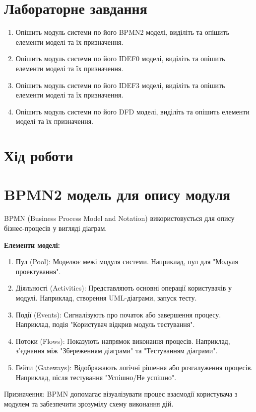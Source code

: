 \documentclass[oneside,14pt]{extarticle}
\begin{document}
\begin{normalsize}
    \section*{Лабораторне завдання}
    \begin{enumerate}
    	\item Опішить модуль системи по його BPMN2 моделі, виділіть та опішить елементи моделі та їх призначення.
    	\item Опішить модуль системи по його IDEF0 моделі, виділіть та опішить елементи моделі та їх призначення.
    	\item Опішить модуль системи по його IDEF3 моделі, виділіть та опішить елементи моделі та їх призначення.
    	\item Опішить модуль системи по його DFD моделі, виділіть та опішить елементи моделі та їх призначення.
    \end{enumerate}
	\section*{Хід роботи}
	
	\section*{BPMN2 модель для опису модуля}
		BPMN (Business Process Model and Notation) використовується для опису бізнес-процесів у вигляді діаграм.
		
		\textbf{Елементи моделі:}
		\begin{enumerate}
			\item Пул (Pool): Моделює межі модуля системи. Наприклад, пул для "Модуля проектування".
			\item Діяльності (Activities): Представляють основні операції користувачів у модулі. Наприклад, створення UML-діаграми, запуск тесту.
			\item Події (Events): Сигналізують про початок або завершення процесу. Наприклад, подія "Користувач відкрив модуль тестування".
			\item Потоки (Flows): Показують напрямок виконання процесів. Наприклад, з'єднання між "Збереженням діаграми" та "Тестуванням діаграми".
			\item Гейти (Gateways): Відображають логічні рішення або розгалуження процесів. Наприклад, після тестування "Успішно/Не успішно".
		\end{enumerate}
	
	Призначення: 
	BPMN допомагає візуалізувати процес взаємодії користувача з модулем та забезпечити зрозумілу схему виконання дій.
	

\end{normalsize}
\end{document}
